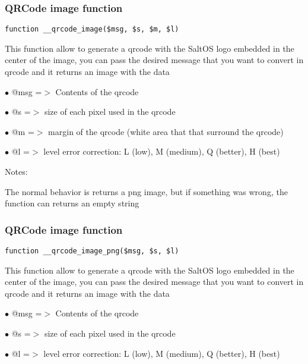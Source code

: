 \documentclass[a4paper]{article}
\begin{document}
\subsubsection{QRCode image function}

\begin{lstlisting}
function __qrcode_image($msg, $s, $m, $l)
\end{lstlisting}

This function allow to generate a qrcode with the SaltOS logo embedded
in the center of the image, you can pass the desired message that you
want to convert in qrcode and it returns an image with the data

\begin{compactitem}
\item[\color{myblue}$\bullet$] @msg =$>$ Contents of the qrcode
\item[\color{myblue}$\bullet$] @s   =$>$ size of each pixel used in the qrcode
\item[\color{myblue}$\bullet$] @m   =$>$ margin of the qrcode (white area that that surround the qrcode)
\item[\color{myblue}$\bullet$] @l   =$>$ level error correction: L (low), M (medium), Q (better), H (best)
\end{compactitem}

Notes:

The normal behavior is returns a png image, but if something was wrong,
the function can returns an empty string

\hypertarget{toc523}{}
\subsubsection{QRCode image function}

\begin{lstlisting}
function __qrcode_image_png($msg, $s, $l)
\end{lstlisting}

This function allow to generate a qrcode with the SaltOS logo embedded
in the center of the image, you can pass the desired message that you
want to convert in qrcode and it returns an image with the data

\begin{compactitem}
\item[\color{myblue}$\bullet$] @msg =$>$ Contents of the qrcode
\item[\color{myblue}$\bullet$] @s   =$>$ size of each pixel used in the qrcode
\item[\color{myblue}$\bullet$] @l   =$>$ level error correction: L (low), M (medium), Q (better), H (best)
\end{compactitem}
\end{document}
